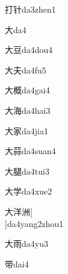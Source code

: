 \begin{verbete}[5;7]{打针}{da3zhen1}
\end{verbete}

\begin{verbete}[3]{大}{da4}
\end{verbete}

\begin{verbete}[3;7]{大豆}{da4dou4}
\end{verbete}

\begin{verbete}[3;4]{大夫}{da4fu5}
\end{verbete}

\begin{verbete}[3;13]{大概}{da4gai4}
\end{verbete}

\begin{verbete}[3;10]{大海}{da4hai3}
\end{verbete}

\begin{verbete}[3;10]{大家}{da4jia1}
\end{verbete}

\begin{verbete}[3;13]{大蒜}{da4suan4}
\end{verbete}

\begin{verbete}[3;13]{大腿}{da4tui3}
\end{verbete}

\begin{verbete}[3;8]{大学}{da4xue2}
\end{verbete}

\begin{verbete*}[3;9;9]{大洋洲}[\\]{da4yang2zhou1}
\end{verbete*}

\begin{verbete}[3;8]{大雨}{da4yu3}
\end{verbete}

\begin{verbete}[9]{带}{dai4}
\end{verbete}

